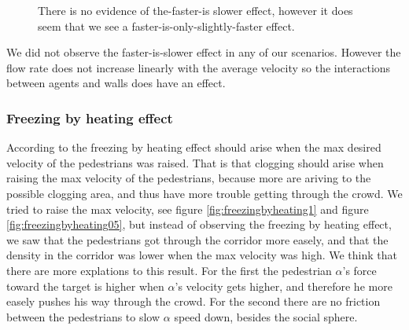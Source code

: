 \begin{figure}[h]
\caption{There is no evidence of the-faster-is slower effect, however it does seem that we see a faster-is-only-slightly-faster effect.}
\label{fig:isfasterslower}
\end{figure}

We did not observe the faster-is-slower effect in any of our 
scenarios. However the flow rate does not increase linearly 
with the average velocity so the interactions between agents 
and walls does have an effect.

\subsubsection{Freezing by heating effect}
According to \cite{self-org} the freezing by heating effect should 
arise when the max desired velocity of the pedestrians was raised.
That is that clogging should arise when raising the max velocity of 
the pedestrians, because more are ariving to the possible clogging area, 
and thus have more trouble getting through the crowd. We tried to raise 
the max velocity, see figure \ref{fig:freezingbyheating1} and figure 
\ref{fig:freezingbyheating05}, but instead of observing the freezing 
by heating effect, we saw that the pedestrians got through the corridor 
more easely, and that the density in the corridor was lower when the 
max velocity was high. We think that there are more explations to this 
result. For the first the pedestrian $\alpha$'s force toward the target
is higher when $\alpha$'s velocity gets higher, and therefore he more 
easely pushes his way through the crowd. For the second there are no 
friction between the pedestrians to slow $\alpha$ speed down, besides 
the social sphere.

